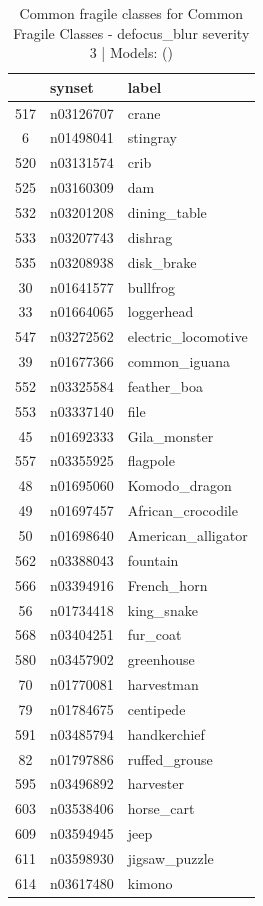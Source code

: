 \begin{table}
\caption{Common fragile classes for Common Fragile Classes - defocus_blur severity 3 | Models: ()}
\label{tab:Common Fragile Classes - defocus_blur severity 3_d41d8cd9}
\begin{tabular}{cll}
\toprule
 & synset & label \\
\midrule
517 & n03126707 & crane \\
6 & n01498041 & stingray \\
520 & n03131574 & crib \\
525 & n03160309 & dam \\
532 & n03201208 & dining_table \\
533 & n03207743 & dishrag \\
535 & n03208938 & disk_brake \\
30 & n01641577 & bullfrog \\
33 & n01664065 & loggerhead \\
547 & n03272562 & electric_locomotive \\
39 & n01677366 & common_iguana \\
552 & n03325584 & feather_boa \\
553 & n03337140 & file \\
45 & n01692333 & Gila_monster \\
557 & n03355925 & flagpole \\
48 & n01695060 & Komodo_dragon \\
49 & n01697457 & African_crocodile \\
50 & n01698640 & American_alligator \\
562 & n03388043 & fountain \\
566 & n03394916 & French_horn \\
56 & n01734418 & king_snake \\
568 & n03404251 & fur_coat \\
580 & n03457902 & greenhouse \\
70 & n01770081 & harvestman \\
79 & n01784675 & centipede \\
591 & n03485794 & handkerchief \\
82 & n01797886 & ruffed_grouse \\
595 & n03496892 & harvester \\
603 & n03538406 & horse_cart \\
609 & n03594945 & jeep \\
611 & n03598930 & jigsaw_puzzle \\
614 & n03617480 & kimono \\

\end{tabular}
\end{table}
